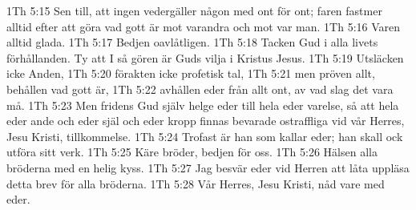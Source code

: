 1Th 5:15  Sen till, att ingen vedergäller någon med ont för ont; faren fastmer alltid efter att göra vad gott är mot varandra och mot var man.
1Th 5:16  Varen alltid glada.
1Th 5:17  Bedjen oavlåtligen.
1Th 5:18  Tacken Gud i alla livets förhållanden. Ty att I så gören är Guds vilja i Kristus Jesus.
1Th 5:19  Utsläcken icke Anden,
1Th 5:20  förakten icke profetisk tal,
1Th 5:21  men pröven allt, behållen vad gott är,
1Th 5:22  avhållen eder från allt ont, av vad slag det vara må.
1Th 5:23  Men fridens Gud själv helge eder till hela eder varelse, så att hela eder ande och eder själ och eder kropp finnas bevarade ostraffliga vid vår Herres, Jesu Kristi, tillkommelse.
1Th 5:24  Trofast är han som kallar eder; han skall ock utföra sitt verk.
1Th 5:25  Käre bröder, bedjen för oss.
1Th 5:26  Hälsen alla bröderna med en helig kyss.
1Th 5:27  Jag besvär eder vid Herren att låta uppläsa detta brev för alla bröderna.
1Th 5:28  Vår Herres, Jesu Kristi, nåd vare med eder.


